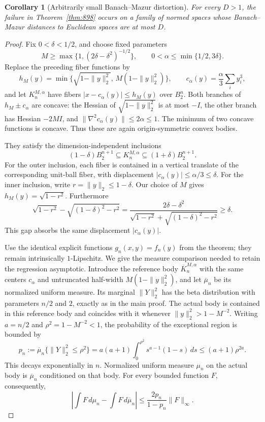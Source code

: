 \documentclass[11pt,a4paper]{article}
\newtheorem{corollary}[theorem]{Corollary}
\theoremstyle{remark}
\begin{document}
\begin{corollary}[Arbitrarily small Banach--Mazur distortion]
\label{cor:898-near-euclidean}
For every $D>1$, the failure in Theorem~\ref{thm:898} occurs on a family
of normed spaces whose Banach--Mazur distances to Euclidean spaces are
at most $D$.
\end{corollary}
\begin{proof}
Fix $0<\delta<1/2$, and choose fixed parameters
\[
 M\geq\max\{1,(2\delta-\delta^2)^{-1/2}\},\qquad
 0<\alpha\leq\min\{1/2,3\delta\}.
\]
Replace the preceding fiber functions by
\[
 h_M(y)=\min\{\sqrt{1-\|y\|_2^2},\,M(1-\|y\|_2^2)\},
 \qquad c_\alpha(y)=\frac\alpha3\sum_i y_i^3,
\]
and let $K_n^{M,\alpha}$ have fibers
$|x-c_\alpha(y)|\leq h_M(y)$ over $B_2^n$.
Both branches of $h_M\pm c_\alpha$ are concave: the Hessian of
$\sqrt{1-\|y\|_2^2}$ is at most $-I$, the other branch has Hessian
$-2MI$, and $\|\nabla^2c_\alpha(y)\|\leq2\alpha\leq1$.
The minimum of two concave functions is concave.  Thus these are again
origin-symmetric convex bodies.

They satisfy the dimension-independent inclusions
\begin{equation}\label{eq:898-close-balls}
 (1-\delta)B_2^{n+1}\subseteq K_n^{M,\alpha}
 \subseteq(1+\delta)B_2^{n+1}.
\end{equation}
For the outer inclusion, each fiber is contained in a vertical translate
of the corresponding unit-ball fiber, with displacement
$|c_\alpha(y)|\leq\alpha/3\leq\delta$.
For the inner inclusion, write $r=\|y\|_2\leq1-\delta$.
Our choice of $M$ gives
$h_M(y)=\sqrt{1-r^2}$.  Furthermore
\[
 \sqrt{1-r^2}-\sqrt{(1-\delta)^2-r^2}
 =\frac{2\delta-\delta^2}
 {\sqrt{1-r^2}+\sqrt{(1-\delta)^2-r^2}}
 \geq\delta.
\]
This gap absorbs the same displacement $|c_\alpha(y)|$.

Use the identical explicit functions $g_n(x,y)=f_n(y)$ from the theorem;
they remain intrinsically $1$-Lipschitz.  We give the measure comparison
needed to retain the regression asymptotic.  Introduce the reference
body $\overline K_n^{M,\alpha}$ with the same centers $c_\alpha$ and
untruncated half-width $M(1-\|y\|_2^2)$, and let $\overline\mu_n$ be
its normalized uniform measure.  Its marginal $\|Y\|_2^2$ has the
beta distribution with parameters $n/2$ and $2$, exactly as in the
main proof.  The actual body is contained in this reference body and
coincides with it whenever $\|y\|_2^2>1-M^{-2}$.
Writing $a=n/2$ and $\rho^2=1-M^{-2}<1$, the probability of the
exceptional region is bounded by
\begin{equation}\label{eq:898-exponential-tail}
 p_n:=\overline\mu_n\{\|Y\|_2^2\leq\rho^2\}
 =a(a+1)\int_0^{\rho^2}s^{a-1}(1-s)\,ds
 \leq(a+1)\rho^{2a}.
\end{equation}
This decays exponentially in $n$.  Normalized uniform measure $\mu_n$
on the actual body is $\overline\mu_n$ conditioned on that body.
For every bounded function $F$, consequently,
\[
 \left|\int F\,d\mu_n-\int F\,d\overline\mu_n\right|
 \leq\frac{2p_n}{1-p_n}\|F\|_\infty.
\]


\end{proof}
\end{document}
